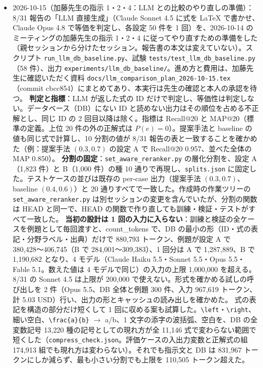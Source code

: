 \documentclass[11pt,a4paper]{jsarticle}
\begin{document}
\begin{itemize}[nosep]
  \item 2026-10-15（加藤先生の指示 1・2・4：LLM との比較のやり直しの準備）：
    8/31 報告の「LLM 直接生成」（Claude Sonnet 4.5 に式を \LaTeX{} で書かせ、Claude Opus 4.8 で等価を判定し、各設定 50 件を 1 回）を、2026-10-14 のミーティングの加藤先生の指示 1・2・4 に従ってやり直すための準備をした（親セッションから分けたセッション。報告書の本文は変えていない）。スクリプト \texttt{run\_llm\_db\_baseline.py}、試験 \texttt{tests/test\_llm\_db\_baseline.py}（58 件）、出力 \texttt{experiments/llm\_db\_baseline/}。進め方と費用は、加藤先生に確認いただく資料 \texttt{docs/llm\_comparison\_plan\_2026-10-15.tex}（commit cbcc854）にまとめてあり、本実行は先生の確認と本人の承認を待つ。
    \textbf{判定と指標}：LLM が返した式の ID だけで判定し、等価性は判定しない。データベース（DB）にない ID と読めない出力はその順位を占める不正解とし、同じ ID の 2 回目以降は除く。指標は Recall@20 と MAP@20（標準の定義。上位 20 件の外の正解式は $P(e)=0$）。提案手法と baseline の値も同じ式で計算し、10 分割の値が 8/31 報告の表と一致することを確かめた（例：提案手法 $(0.3, 0.7)$ の設定 A で Recall@20 0.957、並べた全体の MAP 0.850）。
    \textbf{分割の固定}：\texttt{set\_aware\_reranker.py} の層化分割を、設定 A（1{,}823 件）と B（1{,}000 件）の種 10 通りで再現し、\texttt{splits.json} に固定した。テストケースの並びは既存の per-case 出力（提案手法 $(0.3, 0.7)$、baseline $(0.4, 0.6)$）と 20 通りすべてで一致した。作成時の作業ツリーの \texttt{set\_aware\_reranker.py} は別セッションの変更を含んでいたが、分割の関数は HEAD と同一で、HEAD の関数で作り直しても訓練・検証・テストがすべて一致した。
    \textbf{当初の設計は 1 回の入力に入らない}：訓練と検証の全ケースを例題として毎回渡すと、count\_tokens で、DB の最小の形（ID・式の表記・分野ラベル・出典）だけで 880{,}793 トークン、例題が設定 A で 380{,}428〜406{,}745（B で 284{,}001〜309{,}383）、1 回分は A で 1{,}287{,}889、B で 1{,}190{,}682 となり、4 モデル（Claude Haiku 5.5・Sonnet 5.5・Opus 5.5・Fable 5.1。数えた値は 4 モデルで同じ）の入力の上限 1{,}000{,}000 を超える。8/31 の Sonnet 4.5 は上限が 200{,}000 で使えない。形式を確かめる試しの呼び出しを 2 件（Opus 5.5、DB 全体と例題 300 件、入力 967{,}619 トークン、計 5.03 USD）行い、出力の形とキャッシュの読み出しを確かめた。
    式の表記を構造の部分だけ短くして 1 回に収める案も試算した。\texttt{\textbackslash left}・\texttt{\textbackslash right}、細い空白、\texttt{\textbackslash frac\{a\}\{b\}} $\to$ a/b、1 文字の添字の波括弧、空白を、DB の全変数記号 13{,}220 種の記号としての現れ方が全 11{,}146 式で変わらない範囲で短くした（\texttt{compress\_check.json}。評価ケースの入出力変数と正解式の組 174{,}913 組でも現れ方は変わらない）。それでも指示文と DB は 831{,}967 トークンにしか減らず、最も小さい分割でも上限を 110{,}505 トークン超えた。

\end{itemize}
\end{document}
